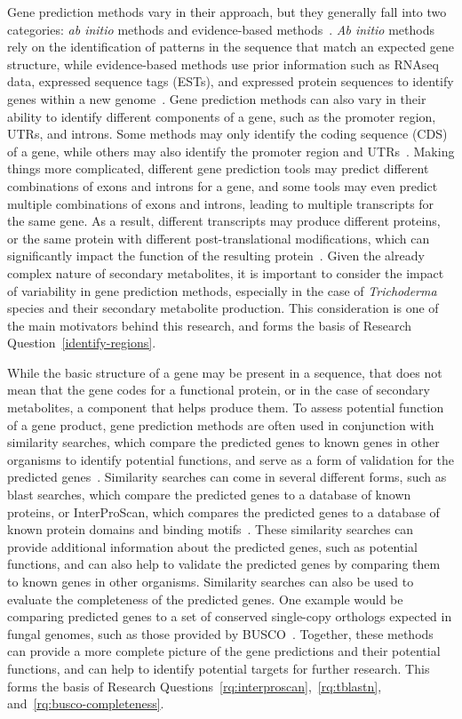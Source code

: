Gene prediction methods vary in their approach, but they generally fall into two categories: \textit{ab initio} methods and evidence-based methods~\cite{ejigu2020a}. \textit{Ab initio} methods rely on the identification of patterns in the sequence that match an expected gene structure, while evidence-based methods use prior information such as RNAseq data, expressed sequence tags (ESTs), and expressed protein sequences to identify genes within a new genome~\cite{ejigu2020a}. Gene prediction methods can also vary in their ability to identify different components of a gene, such as the promoter region, UTRs, and introns. Some methods may only identify the coding sequence (CDS) of a gene, while others may also identify the promoter region and UTRs~\cite{ejigu2020a}. Making things more complicated, different gene prediction tools may predict different combinations of exons and introns for a gene, and some tools may even predict multiple combinations of exons and introns, leading to multiple transcripts for the same gene. As a result, different transcripts may produce different proteins, or the same protein with different post-translational modifications, which can significantly impact the function of the resulting protein~\cite{ejigu2020a}. Given the already complex nature of secondary metabolites, it is important to consider the impact of variability in gene prediction methods, especially in the case of \textit{Trichoderma} species and their secondary metabolite production. This consideration is one of the main motivators behind this research, and forms the basis of Research Question~\ref{identify-regions}.

While the basic structure of a gene may be present in a sequence, that does not mean that the gene codes for a functional protein, or in the case of secondary metabolites, a component that helps produce them. To assess potential function of a gene product, gene prediction methods are often used in conjunction with similarity searches, which compare the predicted genes to known genes in other organisms to identify potential functions, and serve as a form of validation for the predicted genes~\cite{loftus2003a}. 
Similarity searches can come in several different forms, such as blast searches, which compare the predicted genes to a database of known proteins, or InterProScan, which compares the predicted genes to a database of known protein domains and binding motifs~\cite{loftus2003a}. These similarity searches can provide additional information about the predicted genes, such as potential functions, and can also help to validate the predicted genes by comparing them to known genes in other organisms. Similarity searches can also be used to evaluate the completeness of the predicted genes. One example would be comparing predicted genes to a set of conserved single-copy orthologs expected in fungal genomes, such as those provided by BUSCO~\cite{manni2021a}. Together, these methods can provide a more complete picture of the gene predictions and their potential functions, and can help to identify potential targets for further research. This forms the basis of Research Questions~\ref{rq:interproscan},~\ref{rq:tblastn}, and~\ref{rq:busco-completeness}.


